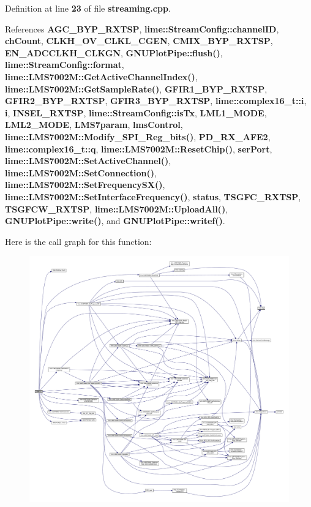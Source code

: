 Definition at line {\bf 23} of file {\bf streaming.\+cpp}.



References {\bf A\+G\+C\+\_\+\+B\+Y\+P\+\_\+\+R\+X\+T\+SP}, {\bf lime\+::\+Stream\+Config\+::channel\+ID}, {\bf ch\+Count}, {\bf C\+L\+K\+H\+\_\+\+O\+V\+\_\+\+C\+L\+K\+L\+\_\+\+C\+G\+EN}, {\bf C\+M\+I\+X\+\_\+\+B\+Y\+P\+\_\+\+R\+X\+T\+SP}, {\bf E\+N\+\_\+\+A\+D\+C\+C\+L\+K\+H\+\_\+\+C\+L\+K\+GN}, {\bf G\+N\+U\+Plot\+Pipe\+::flush()}, {\bf lime\+::\+Stream\+Config\+::format}, {\bf lime\+::\+L\+M\+S7002\+M\+::\+Get\+Active\+Channel\+Index()}, {\bf lime\+::\+L\+M\+S7002\+M\+::\+Get\+Sample\+Rate()}, {\bf G\+F\+I\+R1\+\_\+\+B\+Y\+P\+\_\+\+R\+X\+T\+SP}, {\bf G\+F\+I\+R2\+\_\+\+B\+Y\+P\+\_\+\+R\+X\+T\+SP}, {\bf G\+F\+I\+R3\+\_\+\+B\+Y\+P\+\_\+\+R\+X\+T\+SP}, {\bf lime\+::complex16\+\_\+t\+::i}, {\bf i}, {\bf I\+N\+S\+E\+L\+\_\+\+R\+X\+T\+SP}, {\bf lime\+::\+Stream\+Config\+::is\+Tx}, {\bf L\+M\+L1\+\_\+\+M\+O\+DE}, {\bf L\+M\+L2\+\_\+\+M\+O\+DE}, {\bf L\+M\+S7param}, {\bf lms\+Control}, {\bf lime\+::\+L\+M\+S7002\+M\+::\+Modify\+\_\+\+S\+P\+I\+\_\+\+Reg\+\_\+bits()}, {\bf P\+D\+\_\+\+R\+X\+\_\+\+A\+F\+E2}, {\bf lime\+::complex16\+\_\+t\+::q}, {\bf lime\+::\+L\+M\+S7002\+M\+::\+Reset\+Chip()}, {\bf ser\+Port}, {\bf lime\+::\+L\+M\+S7002\+M\+::\+Set\+Active\+Channel()}, {\bf lime\+::\+L\+M\+S7002\+M\+::\+Set\+Connection()}, {\bf lime\+::\+L\+M\+S7002\+M\+::\+Set\+Frequency\+S\+X()}, {\bf lime\+::\+L\+M\+S7002\+M\+::\+Set\+Interface\+Frequency()}, {\bf status}, {\bf T\+S\+G\+F\+C\+\_\+\+R\+X\+T\+SP}, {\bf T\+S\+G\+F\+C\+W\+\_\+\+R\+X\+T\+SP}, {\bf lime\+::\+L\+M\+S7002\+M\+::\+Upload\+All()}, {\bf G\+N\+U\+Plot\+Pipe\+::write()}, and {\bf G\+N\+U\+Plot\+Pipe\+::writef()}.



Here is the call graph for this function\+:
\nopagebreak
\begin{figure}[H]
\begin{center}
\leavevmode
\includegraphics[width=350pt]{df/d7d/streaming_8cpp_a2a1d481379ef2b25f41edd6058b5f15b_cgraph}
\end{center}
\end{figure}


